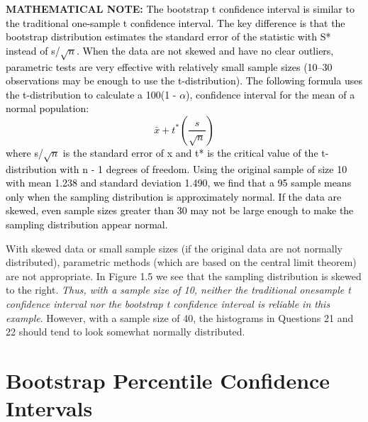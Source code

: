 \documentclass[
]{report}
\begin{document}
\large

\textbf{MATHEMATICAL NOTE:}
\textcolor{black}{The bootstrap t confidence interval is similar to the traditional one-sample t confidence interval. The key difference
is that the bootstrap distribution estimates the standard error of the statistic with S* instead of s/$\sqrt{n}$.
When the data are not skewed and have no clear outliers, parametric tests are very effective with relatively
small sample sizes (10–30 observations may be enough to use the t-distribution). The following formula
uses the t-distribution to calculate a 100(1 - $\alpha$), confidence interval for the mean of a normal population:
\begin{equation} 
  \bar{x} + t^*\left(\frac{s}{\sqrt{n}}\right)
  \tag{1.2} \label{eq:1_2}
\end{equation} 
where s/$\sqrt{n}$ is the standard error of x and t* is the critical value of the t-distribution with n - 1 degrees
of freedom. Using the original sample of size 10 with mean 1.238 and standard deviation 1.490, we find
that a 95%
sample means only when the sampling distribution is approximately normal. If the data are skewed, even
sample sizes greater than 30 may not be large enough to make the sampling distribution appear normal.
}

\normalsize

With skewed data or small sample sizes (if the original data are not normally distributed), parametric
methods (which are based on the central limit theorem) are not appropriate. In Figure 1.5 we see that the
sampling distribution is skewed to the right. \emph{Thus, with a sample size of 10, neither the traditional onesample
t confidence interval nor the bootstrap t confidence interval is reliable in this example}. However,
with a sample size of 40, the histograms in Questions 21 and 22 should tend to look somewhat normally
distributed.

\section*{Bootstrap Percentile Confidence Intervals}\label{bootstrap-percentile-confidence-intervals}
\end{document}
